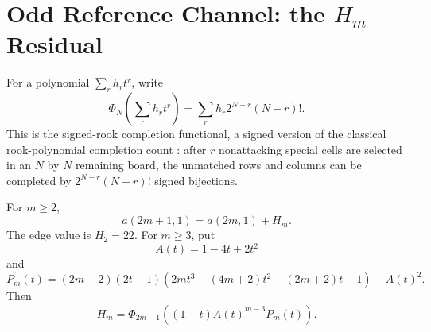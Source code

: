 \section[Odd Reference Channel: the Hm Residual]{Odd Reference Channel: the $H_m$ Residual}\label{sec:hm}

For a polynomial $\sum_r h_r t^r$, write
\[
  \Phi_N\left(\sum_r h_r t^r\right)=\sum_r h_r 2^{N-r}(N-r)!.
\]
This is the signed-rook completion functional, a signed version of the classical rook-polynomial completion count \cite{KaplanskyRiordan1946}: after $r$ nonattacking special cells are selected in an $N$ by $N$ remaining board, the unmatched rows and columns can be completed by $2^{N-r}(N-r)!$ signed bijections.

\begin{lemma}[$H_m$ is the odd $V_{\mathrm{ref}}$, $k=1$, residual]\label{lem:H}
For $m\ge2$,
\[
  a(2m+1,1)=a(2m,1)+H_m.
\]
The edge value is $H_2=22$.  For $m\ge3$, put
\[
  A(t)=1-4t+2t^2
\]
and
\[
  P_m(t)=(2m-2)(2t-1)(2m t^3-(4m+2)t^2+(2m+2)t-1)-A(t)^2.
\]
Then
\[
  H_m=\Phi_{2m-1}\left((1-t)A(t)^{m-3}P_m(t)\right).
\]
\end{lemma}

